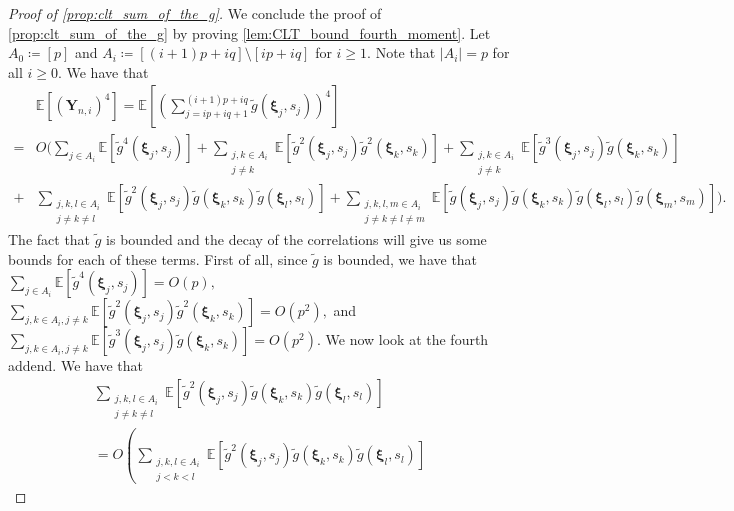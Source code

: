 \documentclass[11pt,a4paper,oneside]{article}
\theoremstyle{definition}
\theoremstyle{remark}
\def\E{\mathbb{E}}
\begin{document}
\begin{proof}[Proof of \cref{prop:clt_sum_of_the_g}]
	We conclude the proof of \cref{prop:clt_sum_of_the_g} by proving \cref{lem:CLT_bound_fourth_moment}. Let $A_0 \coloneqq [p]$ and $A_i \coloneqq [(i+1)p+iq] \setminus [ip+iq]$ for $i \geq 1$. Note that $|A_i|=p$ for all $i\geq 0$. We have that
	\begin{align}
	&\E \left[ \left( \bm Y_{n,i} \right)^4 \right]	= \E \left[ \left( \sum_{j=ip+iq+1}^{(i+1)p+iq} \tilde g \left( \bm \xi_j, s_j \right)  \right)^4 \right] \\
	=&O\Bigg(\sum_{j \in A_i}  \E \left[ \tilde g^4 \left( \bm \xi_j, s_j \right) \right] 
	 +  \sum_{\substack {j,k \in A_i \\ j\neq k}} \E \left[ \tilde g ^2 \left( \bm \xi_j, s_j \right) \tilde g ^2 \left( \bm \xi_k, s_k\right) \right] 
	 +  \sum_{\substack{j,k \in A_i\\ j\neq k}} \E \left[ \tilde g^3 \left( \bm \xi_j, s_j \right) \tilde g \left( \bm \xi_k, s_k\right) \right] \\
	 +  &\sum_{\substack{j,k, l \in A_i \\ j\neq k\neq l}} \E \left[ \tilde g^2 \left( \bm \xi_j, s_j \right) \tilde g \left( \bm \xi_k, s_k\right) \tilde g \left( \bm \xi_l, s_l\right) \right] 
	 +  \sum_{\substack{j,k, l,m \in A_i \\ j\neq k\neq l \neq m}} \E \left[ \tilde g\left( \bm \xi_j, s_j \right) \tilde g \left( \bm \xi_k, s_k\right) \tilde g \left( \bm \xi_l, s_l\right) \tilde g \left( \bm \xi_m, s_m\right) \right]\Bigg).
	\end{align} 
	The fact that $\tilde g$ is bounded and the decay of the correlations will give us some bounds for each of these terms. First of all, since $\tilde g$ is bounded, we have that 
	$
	 \sum_{j \in A_i}  \E \left[ \tilde g^4 \left( \bm \xi_j, s_j \right) \right] = O(p),
	$
	$
		 \sum_{j,k \in A_i, j\neq k} \E \left[ \tilde g^2 \left( \bm \xi_j, s_j \right) \tilde g^2 \left( \bm \xi_k, s_k\right) \right] = O \left(p^2 \right),
	$
	and
	$
	 \sum_{j,k \in A_i, j\neq k} \E \left[ \tilde g^3 \left( \bm \xi_j, s_j \right) \tilde g \left( \bm \xi_k, s_k\right) \right] = O \left(p^2 \right).
	$
	We now look at the fourth addend. 
	We have that 
	\begin{multline}
		 \sum_{\substack{j,k, l \in A_i\\ j\neq k\neq l}} \E \left[ \tilde g^2 \left( \bm \xi_j, s_j \right) \tilde g\left( \bm \xi_k, s_k\right) \tilde g \left( \bm \xi_l, s_l\right) \right] \\
		 =
		 O \left(  
		 \sum_{\substack{j,k, l \in A_i\\ j< k< l}} \E \left[ \tilde g^2 \left( \bm \xi_j, s_j \right) \tilde g\left( \bm \xi_k, s_k\right) \tilde g \left( \bm \xi_l, s_l\right) \right]  

\end{multline}
\end{proof}
\end{document}
